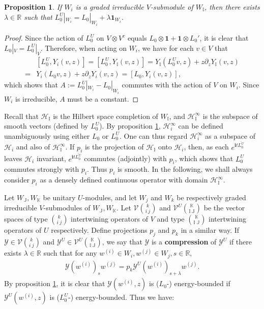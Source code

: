 \documentclass[12pt,a4paper]{article}
\theoremstyle{definition}
\theoremstyle{plain}
\newtheorem{pp}[df]{Proposition}
\newcommand{\mc}{\mathcal}
\newcommand{\ovl}{\overline}
\newcommand{\id}{\mathbf{1}}
\newcommand{\im}{\mathbf{i}}
\newcommand{\mbb}{\mathbb}
\numberwithin{equation}{subsection}
\begin{document}
\begin{pp}\label{lb76}
If $W_i$ is a graded irreducible $V$-submodule of $W_{\mbb I}$, then there exists $\lambda\in\mbb R$ such that $L_0^U|_{W_i}=L_0|_{W_i}+\lambda\id_{W_i}$.
\end{pp}
\begin{proof}
Since the action of $L_0^U$ on $V\otimes V^c$ equals $L_0\otimes \id+\id\otimes L_0'$, it is clear that $L_0|_V=L_0^U|_V$. Therefore, when acting on $W_i$, we have for each $v\in V$ that
\begin{align*}
&[L_0^U, Y_i(v,z)]=[L_0^U, Y_{\mbb I}(v,z)]=Y_{\mbb I}(L_0^Uv,z)+z\partial_zY_{\mbb I}(v,z)\\
=&Y_i(L_0v,z)+z\partial_zY_i(v,z)=[L_0,Y_i(v,z)],
\end{align*}
which shows that $A:=L_0^U|_{W_i}-L_0|_{W_i}$ commutes with the action of $V$ on $W_i$. Since $W_i$ is irreducible, $A$ must be a constant.
\end{proof}


Recall that $\mc H_{\mbb I}$ is the Hilbert space completion of $W_{\mbb I}$, and $\mc H^\infty_{\mbb I}$ is the subspace of smooth vectors (defined by $L_0^U$). By proposition \ref{lb76}, $\mc H_i^\infty$ can be defined unambiguously using either $L_0$ or $L_0^U$. One can thus regard $\mc H_i^\infty$ as a subspace of $\mc H_i$ and also of $\mc H_{\mbb I}^\infty$. If $p_i$ is the projection of $\mc H_{\mbb I}$ onto $\mc H_i$, then, as each $e^{\im t\ovl{L^U_0}}$ leaves $\mc H_i$ invariant, $e^{\im t\ovl{L^U_0}}$ commutes (adjointly) with $p_i$, which shows that $L^U_0$ commutes strongly with $p_i$. Thus $p_i$ is smooth. In the following, we shall always consider $p_i$ as a densely defined continuous operator with domain $\mc H_{\mbb I}^\infty$.


Let $W_{\mbb J},W_{\mbb K}$ be unitary $U$-modules, and let $W_j$ and $W_k$ be respectively graded irreducible $V$-submodules of $W_{\mbb J},W_{\mbb K}$. Let $\mc V{k\choose i~j}$ and $\mc V^U{\mbb K\choose \mbb I~\mbb J}$ be the vector spaces of type $k\choose i~j$ intertwining operators of $V$ and type $\mbb K\choose \mbb I~\mbb J$ intertwining operators of $U$ respectively. Define  projections $p_j$ and $p_k$ in a similar way. If $\mc Y\in\mc V{k\choose i~j}$ and $\mc Y^U\in\mc V^U{\mbb K\choose \mbb I~\mbb J}$, we say that $\mc Y$ is a \textbf{compression} of $\mc Y^U$ if there exists $\lambda\in\mbb R$ such that for any $w^{(i)}\in W_i,w^{(j)}\in W_j,s\in\mbb R$,
\begin{align}
\mc Y(w^{(i)})_sw^{(j)}=p_k\mc Y^U(w^{(i)})_{s+\lambda}w^{(j)}.\label{eq50}
\end{align}
By proposition \ref{lb76}, it is clear that $\mc Y(w^{(i)},z)$ is ($L_0$-) energy-bounded if $\mc Y^U(w^{(i)},z)$ is ($L_0^U$-) energy-bounded. Thus we have:
\end{document}
